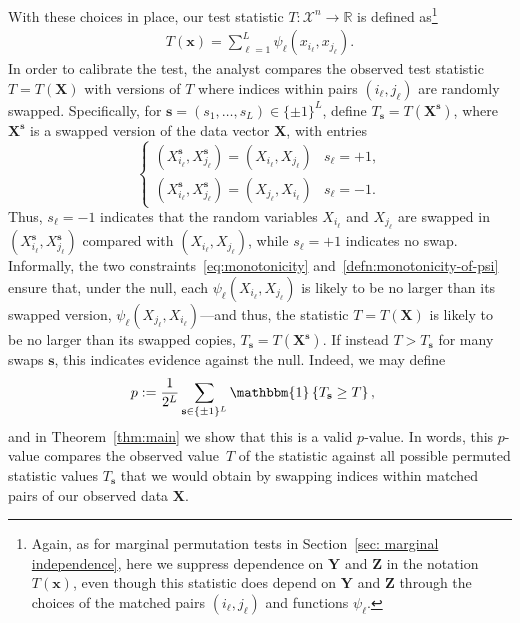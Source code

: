 \documentclass[12pt]{article}
\newcommand{\R}{\mathbb{R}}
\newcommand{\One}[1]{{\mathbbm{1}}\left\{{#1}\right\}}
\newcommand{\bs}{\mathbf{s}}
\newcommand{\bx}{\mathbf{x}}
\newcommand{\bX}{\mathbf{X}}
\newcommand{\bY}{\mathbf{Y}}
\newcommand{\bZ}{\mathbf{Z}}
\begin{document}
With these choices in place, our test statistic $T:\mathcal{X}^n\to\R$ is defined as\footnote{ Again, as for marginal permutation tests in Section~\ref{sec: marginal independence}, here we suppress dependence on $\bY$ and $\bZ$ in the notation $T(\bx)$, even though this statistic does depend on $\bY$ and $\bZ$ through the choices of the matched pairs $(i_\ell,j_\ell)$ and functions $\psi_\ell$.}
    \begin{align}\label{eq:test-stat}
        T(\bx) = \sum_{\ell=1}^L \psi_\ell(x_{i_\ell}, x_{j_\ell}).
    \end{align}
In order to calibrate the test, the analyst compares the observed test statistic $T = T(\bX)$ with versions of $T$ where indices within pairs $(i_\ell, j_\ell)$ are randomly swapped. Specifically, for $\bs = (s_1,\ldots,s_L) \in \{\pm 1\}^L$, define $T_\bs = T(\bX^\bs)$, where $\bX^\bs$ is a swapped version of the data vector $\bX$, with entries
\[
\begin{cases}
    (X_{i_\ell}^\bs, X_{j_\ell}^\bs) = (X_{i_\ell}, X_{j_\ell}) & s_\ell = +1, \\
    (X_{i_\ell}^\bs, X_{j_\ell}^\bs) = (X_{j_\ell}, X_{i_\ell}) & s_\ell = -1.
\end{cases}
\]
Thus, $s_\ell=-1$ indicates that the random variables $X_{i_\ell}$ and $X_{j_\ell}$ are swapped in $(X_{i_\ell}^\bs, X_{j_\ell}^\bs)$ compared with $(X_{i_\ell}, X_{j_\ell})$, while $s_\ell=+1$ indicates no swap.
Informally, the two constraints~\eqref{eq:monotonicity} and~\eqref{defn:monotonicity-of-psi} ensure that, under the null, each $\psi_{\ell}(X_{i_\ell},X_{j_\ell})$ is likely to be no larger than its swapped version, $\psi_{\ell}(X_{j_\ell},X_{i_\ell})$---and thus, the statistic $T=T(\bX)$ is likely to be no larger than its swapped copies, $T_{\bs}=T(\bX^{\bs})$. If instead $T>T_{\bs}$ for many swaps $\bs$, this indicates evidence against the null. Indeed, we may define 
\begin{align}\label{eq:def-test}
p&:= \frac{1}{2^L}\sum_{\bs\in\{\pm 1\}^L}\One{T_\bs \ge T},
\end{align}
and in Theorem~\ref{thm:main} we show that this is a valid $p$-value.  In words, this $p$-value compares the observed value~$T$ of the statistic against all possible permuted statistic values $T_{\bs}$ that we would obtain by swapping indices within matched pairs of our observed data $\bX$.
\end{document}
